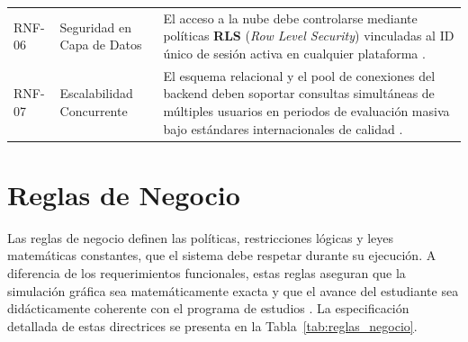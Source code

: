 \begin{table}[htbp]
\begin{tabularx}{\textwidth}{@{} l >{\raggedright\arraybackslash}p{2.6cm} >{\raggedright\arraybackslash}X @{}}
RNF-06 & Seguridad en Capa de Datos &
El acceso a la nube debe controlarse mediante políticas \textbf{RLS} (\textit{Row Level Security}) vinculadas al ID único de sesión activa en cualquier plataforma \cite{supabase2024}. \\

RNF-07 & Escalabilidad Concurrente &
El esquema relacional y el pool de conexiones del backend deben soportar consultas simultáneas de múltiples usuarios en periodos de evaluación masiva bajo estándares internacionales de calidad \cite{iso2011}. \\

\bottomrule
\end{tabularx}
\end{table}

\clearpage
\section{Reglas de Negocio}
\label{sec:reglas_negocio}

Las reglas de negocio definen las políticas, restricciones lógicas y leyes matemáticas constantes, que el sistema debe respetar durante su ejecución. A diferencia de los requerimientos funcionales, estas reglas aseguran que la simulación gráfica sea matemáticamente exacta y que el avance del estudiante sea didácticamente coherente con el programa de estudios \cite{ipn2020, hopcroft2007}. La especificación detallada de estas directrices se presenta en la Tabla~\ref{tab:reglas_negocio}.

